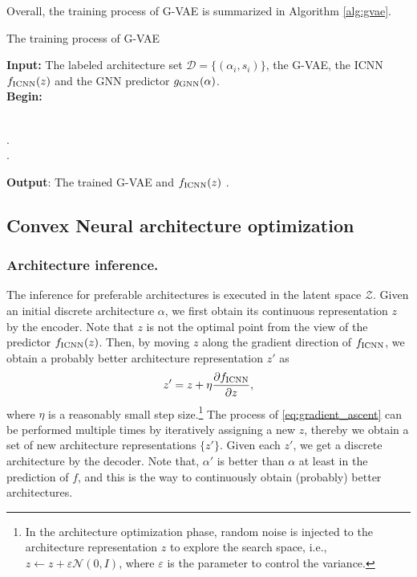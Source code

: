 \documentclass[10pt,twocolumn,letterpaper]{article}
\begin{document}
Overall, the training process of G-VAE is summarized in Algorithm \ref{alg:gvae}.
\begin{algorithm}[htbp]
\caption{The training process of G-VAE}
{\textbf{Input:} The labeled architecture set $\mathcal{D} = \{(\alpha_{i},s_{i})\}$}, the G-VAE, the ICNN $f_{\rm ICNN}(z)$ and the GNN predictor $g_{\rm GNN}(\alpha)$. \\
{\textbf{Begin:}}
\begin{algorithmic}[1]
		 \\
		. \\
		. \\
		 
	\end{algorithmic}
	\textbf{Output}: The trained G-VAE and $f_{\rm ICNN}(z)$ . 
	\label{alg:gvae}
\end{algorithm}
\subsection{Convex Neural architecture optimization}
\subsubsection{Architecture inference.} 
The inference for preferable architectures is executed in the latent space $\mathcal{Z}$. Given an initial discrete architecture $\alpha$, we first obtain its continuous representation $z$ by the encoder. Note that $z$ is not the optimal point from the view of the predictor $f_{\rm ICNN}(z)$. Then, by moving $z$ along the gradient direction of $f_{\rm ICNN}$, we obtain a probably better architecture representation $z'$ as
\begin{equation}
	\label{eq:gradient_ascent}
	z' = z + \eta \frac{\partial f_{\rm ICNN}}{\partial z},
\end{equation}
where $\eta$ is a reasonably small step size.\footnote{In the architecture optimization phase, random noise is injected to the architecture representation $z$ to explore the search space, i.e., $z \leftarrow z + \varepsilon \mathcal{N}(0,I)$, where $\varepsilon$ is the parameter to control the variance.} The process of \eqref{eq:gradient_ascent} can be performed multiple times by iteratively assigning a new $z$, thereby we obtain a set of new architecture representations $\{ z' \}$. Given each $z'$, we get a discrete architecture by the decoder. Note that, $\alpha'$ is better than $\alpha$ at least in the prediction of $f$, and this is the way to continuously obtain (probably) better architectures. 
\end{document}

